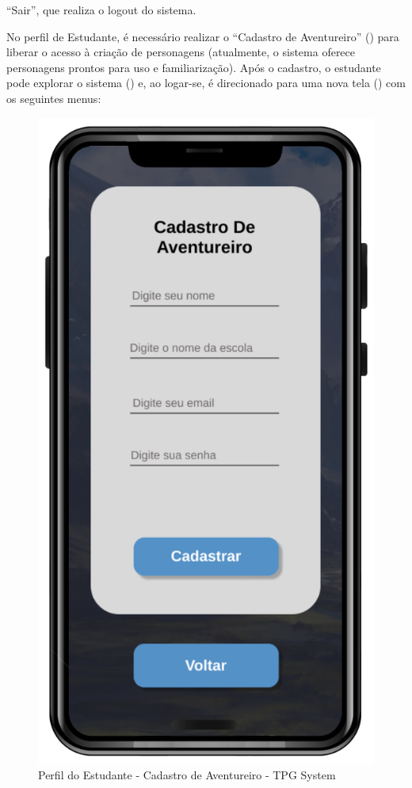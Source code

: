 “Sair”, que realiza o logout do sistema.
\\
\pagebreak

No perfil de Estudante, é necessário realizar o “Cadastro de Aventureiro” () para liberar o acesso à criação de personagens (atualmente, o sistema oferece personagens prontos para uso e familiarização). Após o cadastro, o estudante pode explorar o sistema () e, ao logar-se, é direcionado para uma nova tela () com os seguintes menus:
\\

\begin{figure}[!h]
\centering
\caption{Perfil do Estudante - Cadastro de Aventureiro - TPG System}%
\label{fig:Tela8}
\includegraphics[scale=0.20]{Illustrations/Tela8.png}
\end{figure}

